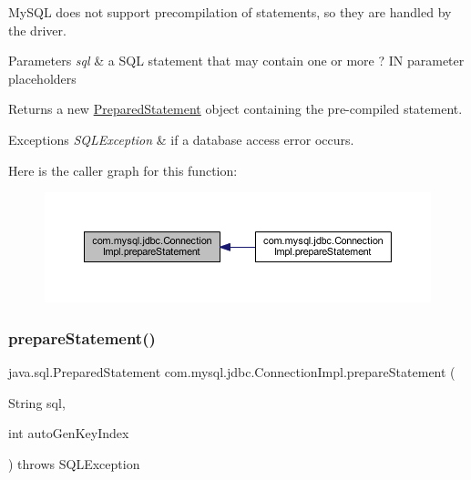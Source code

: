 My\+S\+QL does not support precompilation of statements, so they are handled by the driver. 


\begin{DoxyParams}{Parameters}
{\em sql} & a S\+QL statement that may contain one or more \textquotesingle{}?\textquotesingle{} IN parameter placeholders \\
\hline
\end{DoxyParams}
\begin{DoxyReturn}{Returns}
a new \mbox{\hyperlink{classcom_1_1mysql_1_1jdbc_1_1_prepared_statement}{Prepared\+Statement}} object containing the pre-\/compiled statement. 
\end{DoxyReturn}

\begin{DoxyExceptions}{Exceptions}
{\em S\+Q\+L\+Exception} & if a database access error occurs. \\
\hline
\end{DoxyExceptions}
Here is the caller graph for this function\+:\nopagebreak
\begin{figure}[H]
\begin{center}
\leavevmode
\includegraphics[width=350pt]{classcom_1_1mysql_1_1jdbc_1_1_connection_impl_ae88b1d09280bb34e6e52efff869ce61f_icgraph}
\end{center}
\end{figure}
\mbox{\label{classcom_1_1mysql_1_1jdbc_1_1_connection_impl_a43922e839ec8ab1bac49422ad317b1d8}} 
\subsubsection{\texorpdfstring{prepare\+Statement()}{prepareStatement()}\hspace{0.1cm}{\footnotesize\ttfamily [2/6]}}
{\footnotesize\ttfamily java.\+sql.\+Prepared\+Statement com.\+mysql.\+jdbc.\+Connection\+Impl.\+prepare\+Statement (\begin{DoxyParamCaption}\item[{String}]{sql,  }\item[{int}]{auto\+Gen\+Key\+Index }\end{DoxyParamCaption}) throws S\+Q\+L\+Exception}


